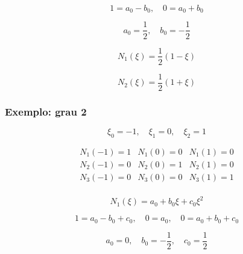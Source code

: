         \begin{equation*}
            1 = a_0 - b_0, \quad 0 = a_0 + b_0
        \end{equation*}

        \begin{equation*}
            a_0 = \frac{1}{2}, \quad b_0 = -\frac{1}{2}
        \end{equation*}

        \begin{equation*}
            N_1(\xi) = \frac{1}{2}\left(1-\xi\right)
        \end{equation*}

        \begin{equation*}
            N_2(\xi) = \frac{1}{2}\left(1+\xi\right)
        \end{equation*}

        \subsubsection*{Exemplo: grau 2}

        \begin{equation*}
                \xi_0 = -1, \quad \xi_1 = 0 , \quad \xi_2 = 1
            \end{equation*}

        \begin{equation*}
            \begin{array}{ccc}
                N_1(-1) = 1 & N_1(0) = 0 & N_1(1) = 0\\
                N_2(-1) = 0 & N_2(0) = 1 & N_2(1) = 0\\
                N_3(-1) = 0 & N_3(0) = 0 & N_3(1) = 1\\
            \end{array}
        \end{equation*}

        \begin{equation*}
            N_1(\xi) = a_0 + b_0 \xi + c_0 \xi^2
        \end{equation*}

        \begin{equation*}
            1 = a_0 - b_0 + c_0, \quad 0 = a_0 , \quad 0 = a_0 + b_0 + c_0
        \end{equation*}

        \begin{equation*}
            a_0 = 0, \quad b_0 = -\frac{1}{2} , \quad c_0 = \frac{1}{2}
        \end{equation*}

